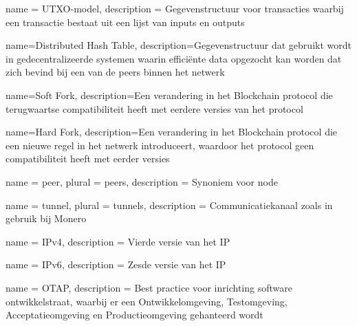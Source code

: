 


 {
  name = {UTXO-model},
  description = {Gegevenstructuur voor transacties waarbij een transactie bestaat uit een lijst van inputs en outputs}
}

 {
  name={Distributed Hash Table},
  description={Gegevenstructuur dat gebruikt wordt in gedecentralizeerde systemen waarin efficiënte data opgezocht kan worden dat zich bevind bij een van de \glspl{peer} binnen het netwerk}
}

 {
  name={Soft Fork},
  description={Een verandering in het Blockchain protocol die terugwaartse compatibiliteit heeft met eerdere versies van het protocol}
}

 {
  name={Hard Fork},
  description={Een verandering in het Blockchain protocol die een nieuwe regel in het netwerk introduceert, waardoor het protocol geen compatibiliteit heeft met eerder versies}
}

 {
  name = {peer},
  plural = {peers},
  description = {Synoniem voor \gls{node}}
}

 {
  name = {tunnel},
  plural = {tunnels},
  description = {Communicatiekanaal zoals in gebruik bij Monero}
}

 {
  name = {IPv4},
  description = {Vierde versie van het \acrfull{IP}}
}

 {
  name = {IPv6},
  description = {Zesde versie van het \acrfull{IP}}
}

 {
  name = {OTAP},
  description = {Best practice voor inrichting software ontwikkelstraat, waarbij er een Ontwikkelomgeving, Testomgeving, Acceptatieomgeving en Productieomgeving gehanteerd wordt}
}

